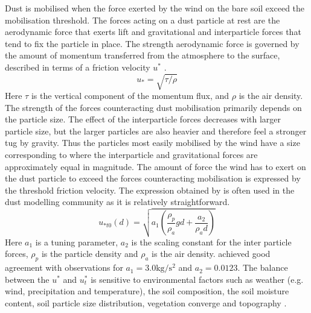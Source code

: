 Dust is mobilised when the force exerted by the wind on the bare soil exceed the mobilisation threshold. The forces acting on a dust particle at rest are the aerodynamic force that exerts lift and gravitational and interparticle forces that tend to fix the particle in place. 
The strength aerodynamic force is governed by the amount of momentum transferred from the atmosphere to the surface, described in terms of a friction velocity $u^*$ \parencite{ShaoYaping2008PaMo}.
\begin{equation}
    u_* = \sqrt{\tau/\rho}
\end{equation}
Here $\tau$ is the vertical component of the momentum flux, and $\rho$ is the air density. The strength of the forces counteracting dust mobilisation primarily depends on the particle size. The effect of the interparticle forces decreases with larger particle size, but the larger particles are also heavier and therefore feel a stronger tug by gravity. Thus the particles most easily mobilised by the wind have a size corresponding to where the interparticle and gravitational forces are approximately equal in magnitude.     
The amount of force the wind has to exert on the dust particle to exceed the forces counteracting mobilisation is expressed by the threshold friction velocity. The expression obtained by \textcite{shao2000simple} is often used in the dust modelling community as it is relatively straightforward. 
\begin{equation}\label{eq:treshold_fric_vel}
    u_{*t0}(d) = \sqrt{a_1 \left(\frac{\rho_p}{\rho_a}gd+\frac{a_2}{\rho_ad}\right)} 
\end{equation}
Here $a_1$ is a tuning parameter, $a_2$ is the scaling constant for the inter particle forces, $\rho_p$ is the particle density and $\rho_a$ is the air density. \textcite{shao2000simple} achieved good agreement with observations for $a_1 = 3.0\si{\kg\per\s\squared}$ and $a_2 = 0.0123$. 
The balance between the $u^*$ and $u^*_t$ is sensitive to environmental factors such as weather (e.g. wind, precipitation and temperature), the soil composition, the soil moisture content, soil particle size distribution, vegetation converge and topography .  

